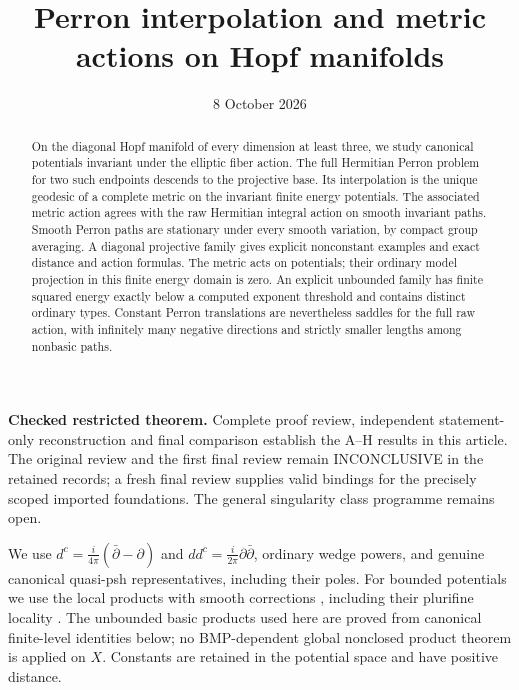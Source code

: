 \documentclass[11pt]{article}
\title{Perron interpolation and metric actions on Hopf manifolds}
\author{}
\date{8 October 2026}
\newcommand{\ddc}{dd^c}
\theoremstyle{remark}\newtheorem{remark}[theorem]{Remark}
\begin{document}
\maketitle
\noindent\textbf{Checked restricted theorem.} Complete proof review,
independent statement-only reconstruction and final comparison establish
the A--H results in this article. The original review and the first
final review remain INCONCLUSIVE in the retained records; a fresh final
review supplies valid bindings for the precisely scoped imported
foundations. The general singularity class programme remains open.
\begin{abstract}
On the diagonal Hopf manifold of every dimension at least three, we study
canonical potentials invariant under the elliptic fiber action. The full
Hermitian Perron problem for two such endpoints descends to the projective
base. Its interpolation is the unique geodesic of a complete metric on the
invariant finite energy potentials. The associated metric action agrees
with the raw Hermitian integral action on smooth invariant paths. Smooth
Perron paths are stationary under every smooth variation, by compact group
averaging. A diagonal projective family gives explicit nonconstant examples
and exact distance and action formulas. The metric acts on potentials;
their ordinary model projection in this finite energy domain is zero.
An explicit unbounded family has finite squared energy exactly below a
computed exponent threshold and contains distinct ordinary types.
Constant Perron translations are nevertheless saddles for the full raw
action, with infinitely many negative directions and strictly smaller
lengths among nonbasic paths.
\end{abstract}

We use $d^c=\frac{i}{4\pi}(\bar\partial-\partial)$ and
$\ddc=\frac{i}{2\pi}\partial\bar\partial$, ordinary wedge powers,
and genuine canonical quasi-psh representatives, including their poles.
For bounded potentials we use the local products with smooth corrections
\cite[Section 2.1 and Proposition 2.1]{BGL}, including their plurifine
locality \cite{BTfine}. The unbounded basic products used here are proved
from canonical finite-level identities below; no BMP-dependent global
nonclosed product theorem is applied on $X$. Constants are retained in
the potential space and have positive distance.
\end{document}
